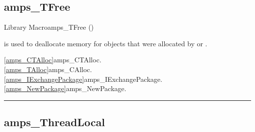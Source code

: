 \subsection{amps\_TFree}
\label{amps_TFree}


\begin{deftypefn}{Library Macro}{}{amps\_TFree}
()

\DESCRIPTION

 is used to deallocate memory for objects
that were allocated by  or
.

\SEEALSO
\vref{amps_CTAlloc}{amps\_CTAlloc}. \\
\vref{amps_TAlloc}{amps\_CAlloc}. \\
\vref{amps_IExchangePackage}{amps\_IExchangePackage}. \\
\vref{amps_NewPackage}{amps\_NewPackage}. \\

\end{deftypefn}


\noindent\rule{\textwidth}{1mm}

\subsection{amps\_ThreadLocal}
\label{amps_ThreadLocal}


